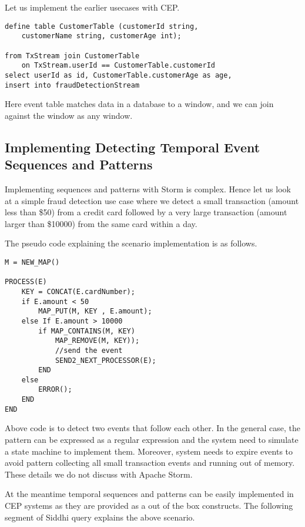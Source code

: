 \documentclass{sig-alternate}
\begin{document}
{Let us implement the earlier usecases with CEP.

\begin{lstlisting}[mathescape, showstringspaces=false]
define table CustomerTable (customerId string, 
	customerName string, customerAge int);

from TxStream join CustomerTable
	on TxStream.userId == CustomerTable.customerId
select userId as id, CustomerTable.customerAge as age, 
insert into fraudDetectionStream
\end{lstlisting} 

Here event table matches data in a database to a window, and we can join against the window as any window.

\subsection{Implementing Detecting Temporal Event Sequences and Patterns}

Implementing sequences and patterns with Storm is complex. Hence let us look at a simple  fraud detection use case where we detect a small transaction (amount less than \$50) from a credit card followed by a very large transaction (amount larger than \$10000) from the same card within a day. 

The pseudo code explaining the scenario implementation is as follows.
 
\begin{lstlisting}[mathescape,showstringspaces=false]
M = NEW_MAP()

PROCESS(E)  
	KEY = CONCAT(E.cardNumber); 
	if E.amount < 50
		MAP_PUT(M, KEY , E.amount); 
	else If E.amount > 10000
		if MAP_CONTAINS(M, KEY)
			MAP_REMOVE(M, KEY));
			//send the event		     
			SEND2_NEXT_PROCESSOR(E); 
		END
	else
		ERROR();
	END	
END
\end{lstlisting}  
 

Above code is to detect two events that follow each other. In the general case, the pattern can be expressed as a regular expression and the system need to simulate a state machine to implement them. Moreover, system needs to expire events to avoid pattern collecting all small transaction events and running out of memory. These details we do not discuss with Apache Storm. 

At the meantime  temporal sequences and patterns can be easily implemented in CEP systems as they are provided as a out of the box constructs. The following segment of Siddhi query explains the above scenario.


}
\end{document}
